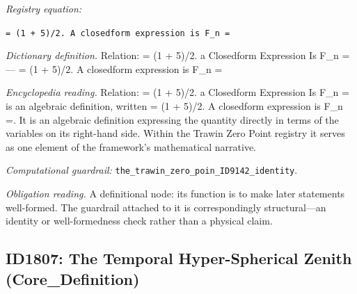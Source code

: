 \documentclass[11pt]{article}
\theoremstyle{remark}
\begin{document}
\noindent\textit{Registry equation:}\par
{\small\texttt{= (1 + 5)/2. A closedform expression is F\_n =}}\par\medskip
\noindent\textit{Dictionary definition.} Relation: = (1 + 5)/2. a Closedform Expression Is F\_n = --- = (1 + 5)/2. A closedform expression is F\_n =\par\medskip
\noindent\textit{Encyclopedia reading.} Relation: = (1 + 5)/2. a Closedform Expression Is F\_n = is an algebraic definition, written = (1 + 5)/2. A closedform expression is F\_n =. It is an algebraic definition expressing the quantity directly in terms of the variables on its right-hand side. Within the Trawin Zero Point registry it serves as one element of the framework's mathematical narrative.
\par\medskip\noindent\textit{Computational guardrail:} \texttt{the\_trawin\_zero\_poin\_ID9142\_identity}.
\par\medskip\noindent\textit{Obligation reading.} A definitional node: its function is to make later statements well-formed. The guardrail attached to it is correspondingly structural---an identity or well-formedness check rather than a physical claim.

\subsection{ID1807: The Temporal Hyper-Spherical Zenith (Core\_Definition)}
\end{document}
